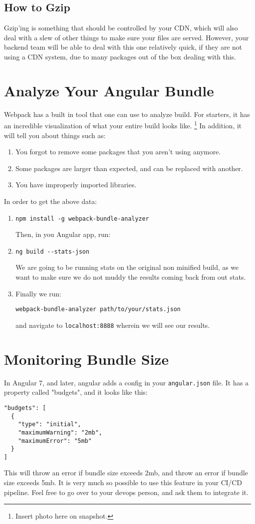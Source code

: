 \subsection{ How to Gzip }
Gzip'ing is something that should be controlled by your CDN, which will also 
deal with a slew of other things to make sure your files are served. However, 
your backend team will be able to deal with this one relatively quick, if they 
are not using a CDN system, due to many packages out of the box dealing with 
this. 

\section{Analyze Your Angular Bundle}
Webpack has a built in tool that one can use to analyze build. For starters, 
it has an incredible visualization of what your entire build looks like.
\footnote{Insert photo here on snapshot.} In addition, it will tell you about 
things such as: 
\begin{enumerate}
  \item You forgot to remove some packages that you aren't using anymore.
  \item Some packages are larger than expected, and can be replaced with
  another.
  \item You have improperly imported libraries.
\end{enumerate}

In order to get the above data: 
\begin{enumerate}
\item 
\begin{verbatim}
npm install -g webpack-bundle-analyzer 
\end{verbatim}
Then, in you Angular app, run: 
\item 
\begin{verbatim}
ng build --stats-json
\end{verbatim}
We are going to be running stats on the original non minified build, as we 
want to make sure we do not muddy the results coming back from out stats. 
\item 
Finally we run: 
\begin{verbatim}
webpack-bundle-analyzer path/to/your/stats.json  
\end{verbatim}
and navigate to \lstinline{localhost:8888} wherein we will see our results.
\end{enumerate}

\section{Monitoring Bundle Size}
In Angular 7, and later, angular adds a config in your \lstinline{angular.json}
file. It has a property called "budgets", and it looks like this: 
\begin{lstlisting}
"budgets": [
  {
    "type": "initial",
    "maximumWarning": "2mb",
    "maximumError": "5mb"
  }
]   
\end{lstlisting}

This will throw an error if bundle size exceeds 2mb, and throw an error if 
bundle size exceeds 5mb. It is very much so possible to use this feature in
your CI/CD pipeline. Feel free to go over to your devops person, and ask them 
to integrate it. 
